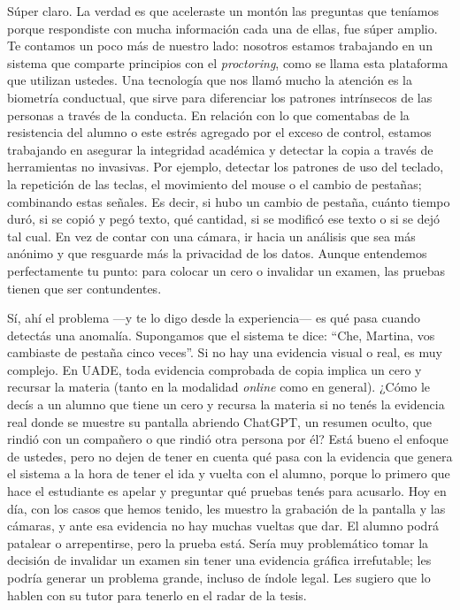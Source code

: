 \begin{description}[leftmargin=0cm, labelsep=0.5cm, style=nextline]
\item[\textbf{Entrevistador:}] Súper claro. La verdad es que aceleraste un montón las preguntas que teníamos porque respondiste con mucha información cada una de ellas, fue súper amplio. Te contamos un poco más de nuestro lado: nosotros estamos trabajando en un sistema que comparte principios con el \textit{proctoring}, como se llama esta plataforma que utilizan ustedes. Una tecnología que nos llamó mucho la atención es la biometría conductual, que sirve para diferenciar los patrones intrínsecos de las personas a través de la conducta. En relación con lo que comentabas de la resistencia del alumno o este estrés agregado por el exceso de control, estamos trabajando en asegurar la integridad académica y detectar la copia a través de herramientas no invasivas. Por ejemplo, detectar los patrones de uso del teclado, la repetición de las teclas, el movimiento del mouse o el cambio de pestañas; combinando estas señales. Es decir, si hubo un cambio de pestaña, cuánto tiempo duró, si se copió y pegó texto, qué cantidad, si se modificó ese texto o si se dejó tal cual. En vez de contar con una cámara, ir hacia un análisis que sea más anónimo y que resguarde más la privacidad de los datos. Aunque entendemos perfectamente tu punto: para colocar un cero o invalidar un examen, las pruebas tienen que ser contundentes.
\item[\textbf{Entrevistado:}] Sí, ahí el problema ---y te lo digo desde la experiencia--- es qué pasa cuando detectás una anomalía. Supongamos que el sistema te dice: ``Che, Martina, vos cambiaste de pestaña cinco veces''. Si no hay una evidencia visual o real, es muy complejo. En UADE, toda evidencia comprobada de copia implica un cero y recursar la materia (tanto en la modalidad \textit{online} como en general). ¿Cómo le decís a un alumno que tiene un cero y recursa la materia si no tenés la evidencia real donde se muestre su pantalla abriendo ChatGPT, un resumen oculto, que rindió con un compañero o que rindió otra persona por él? Está bueno el enfoque de ustedes, pero no dejen de tener en cuenta qué pasa con la evidencia que genera el sistema a la hora de tener el ida y vuelta con el alumno, porque lo primero que hace el estudiante es apelar y preguntar qué pruebas tenés para acusarlo. Hoy en día, con los casos que hemos tenido, les muestro la grabación de la pantalla y las cámaras, y ante esa evidencia no hay muchas vueltas que dar. El alumno podrá patalear o arrepentirse, pero la prueba está. Sería muy problemático tomar la decisión de invalidar un examen sin tener una evidencia gráfica irrefutable; les podría generar un problema grande, incluso de índole legal. Les sugiero que lo hablen con su tutor para tenerlo en el radar de la tesis.

\end{description}
